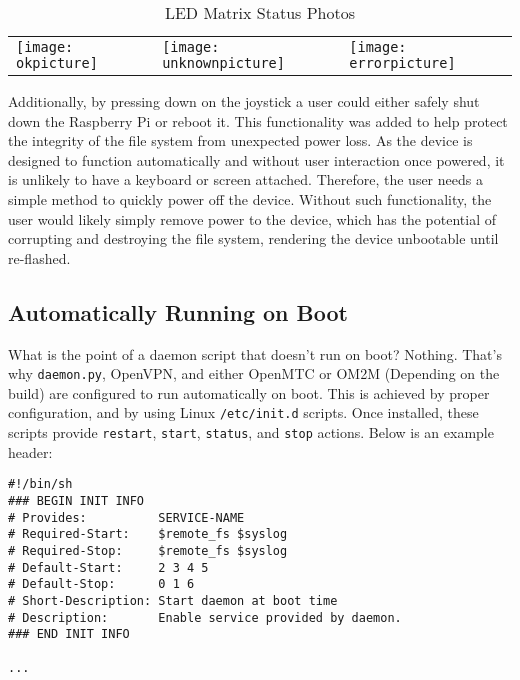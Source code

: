 \begin{table}[H]
\centering
\begin{tabular}{l|l|l}
\texttt{[image: okpicture]}&\texttt{[image: unknownpicture]}&\texttt{[image: errorpicture]}\\
\end{tabular}
\caption{LED Matrix Status Photos}
\label{fig:led-matrix-status-photos}
\end{table}

Additionally, by pressing down on the joystick a user could either safely shut down the Raspberry Pi or reboot it. This functionality was added to help protect the integrity of the file system from unexpected power loss. As the device is designed to function automatically and without user interaction once powered, it is unlikely to have a keyboard or screen attached. Therefore, the user needs a simple method to quickly power off the device. Without such functionality, the user would likely simply remove power to the device, which has the potential of corrupting and destroying the file system, rendering the device unbootable until re-flashed.

\subsection{Automatically Running on Boot}

What is the point of a daemon script that doesn't run on boot? Nothing. That's why \lstinline{daemon.py}, OpenVPN, and either OpenMTC or OM2M (Depending on the build) are configured to run automatically on boot. This is achieved by proper configuration, and by using Linux \lstinline{/etc/init.d} scripts. Once installed, these scripts provide \lstinline{restart}, \lstinline{start}, \lstinline{status}, and \lstinline{stop} actions. Below is an example header:\\

\begin{lstlisting}[caption={init.d Header}, label={lst:header}]
#!/bin/sh
### BEGIN INIT INFO
# Provides:          SERVICE-NAME
# Required-Start:    $remote_fs $syslog
# Required-Stop:     $remote_fs $syslog
# Default-Start:     2 3 4 5
# Default-Stop:      0 1 6
# Short-Description: Start daemon at boot time
# Description:       Enable service provided by daemon.
### END INIT INFO

...
\end{lstlisting}

